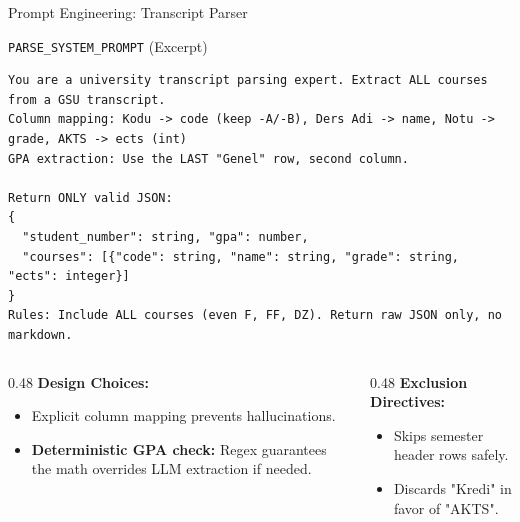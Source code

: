 \documentclass[aspectratio=169]{beamer}
\begin{document}
\begin{frame}[fragile]{Prompt Engineering: Transcript Parser}
  \begin{block}{\texttt{PARSE\_SYSTEM\_PROMPT} (Excerpt)}
    \begin{lstlisting}[style=prompt]
You are a university transcript parsing expert. Extract ALL courses from a GSU transcript.
Column mapping: Kodu -> code (keep -A/-B), Ders Adi -> name, Notu -> grade, AKTS -> ects (int)
GPA extraction: Use the LAST "Genel" row, second column.

Return ONLY valid JSON:
{
  "student_number": string, "gpa": number, 
  "courses": [{"code": string, "name": string, "grade": string, "ects": integer}]
}
Rules: Include ALL courses (even F, FF, DZ). Return raw JSON only, no markdown.
    \end{lstlisting}
  \end{block}
  \vspace{-0.5em}
  \begin{columns}[T]
    \begin{column}{0.48\textwidth}
      \textbf{Design Choices:}
      \begin{itemize}
        \scriptsize
        \item Explicit column mapping prevents hallucinations.
        \item \textbf{Deterministic GPA check:} Regex guarantees the math overrides LLM extraction if needed.
      \end{itemize}
    \end{column}
    \begin{column}{0.48\textwidth}
      \textbf{Exclusion Directives:}
      \begin{itemize}
        \scriptsize
        \item Skips semester header rows safely.
        \item Discards "Kredi" in favor of "AKTS".
      \end{itemize}
    \end{column}
  \end{columns}
\end{frame}
\end{document}
